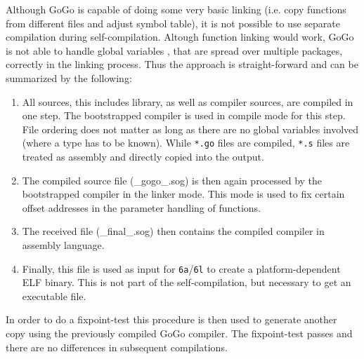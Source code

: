 \documentclass[a4paper]{scrartcl}
\begin{document}
      Although GoGo is capable of doing some very basic linking (i.e. copy 
      functions from different files and adjust symbol table), it is not
      possible to use separate compilation during self-compilation. Altough
      function linking would work, GoGo is not able to handle global variables
      , that are spread over multiple packages, correctly in the linking process.
      Thus the approach is straight-forward and can be summarized by the following:
      \begin{enumerate}
        \item All sources, this includes library, as well as compiler sources, 
          are compiled in one step. The bootstrapped compiler is used in compile
          mode for this step. 
          File ordering does not matter as long as there are no global
          variables involved (where a type has to be known). While \texttt{*.go}
          files are compiled, \texttt{*.s} files are treated as assembly and 
          directly copied into the output.
        \item The compiled source file (\_gogo\_.sog) is then again processed by
          the bootstrapped compiler in the linker mode. This mode is used to fix
          certain offset addresses in the parameter handling of functions.
        \item The received file (\_final\_.sog) then contains the compiled 
          compiler in assembly language.
        \item Finally, this file is used as input for \texttt{6a}/\texttt{6l} to
          create a platform-dependent ELF binary. This is not part of the self-compilation,
          but necessary to get an executable file.
      \end{enumerate}

      In order to do a fixpoint-test this procedure is then used to generate 
      another copy using the previously compiled GoGo compiler. The 
      fixpoint-test passes and there are no differences in subsequent compilations.
\end{document}
